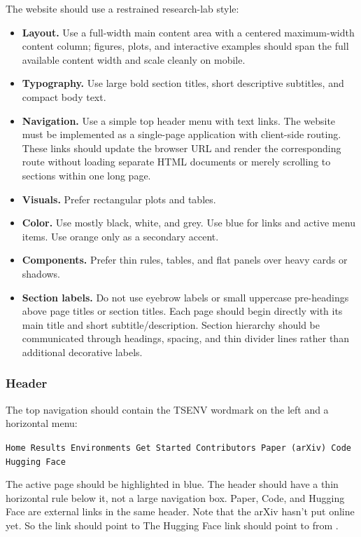 \documentclass[11pt]{article}
\begin{document}
The website should use a restrained research-lab style:

\begin{itemize}
    \item \textbf{Layout.} Use a full-width main content area with a centered maximum-width content column; figures, plots, and interactive examples should span the full available content width and scale cleanly on mobile.
    \item \textbf{Typography.} Use large bold section titles, short descriptive subtitles, and compact body text.
    \item \textbf{Navigation.} Use a simple top header menu with text links. The website must be implemented as a single-page application with client-side routing. These links should update the browser URL and render the corresponding route without loading separate HTML documents or merely scrolling to sections within one long page.
    \item \textbf{Visuals.} Prefer rectangular plots and tables.
    \item \textbf{Color.} Use mostly black, white, and grey. Use blue for links and active menu items. Use orange only as a secondary accent.
    \item \textbf{Components.} Prefer thin rules, tables, and flat panels over heavy cards or shadows.
    \item \textbf{Section labels.} Do not use eyebrow labels or small uppercase pre-headings above page titles or section titles. 
    Each page should begin directly with its main title and short subtitle/description.
    Section hierarchy should be communicated through headings, spacing, and thin divider lines rather than additional decorative labels.
\end{itemize}

\subsubsection*{Header}

The top navigation should contain the TSENV wordmark on the left and a horizontal menu:

\begin{center}
\texttt{Home \quad Results \quad Environments \quad Get Started \quad Contributors \quad Paper (arXiv) \quad Code \quad Hugging Face}
\end{center}

The active page should be highlighted in blue.
The header should have a thin horizontal rule below it, not a large navigation box.
Paper, Code, and Hugging Face are external links in the same header.
Note that the arXiv hasn't put online yet. 
So the link should point to 
The Hugging Face link should point to  from .
\end{document}
